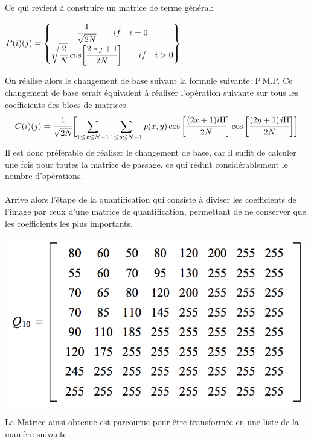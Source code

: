 \documentclass[12pt]{article}
\begin{document}
\paragraph{}

Ce qui revient à construire un matrice de terme général:
\begin{center}
$P(i)(j)=
\begin{Bmatrix}
\cfrac{1}{\sqrt{2N}}  \qquad if \quad i=0 \\
\sqrt{\cfrac{2}{N}} \: cos\biggl[\cfrac{2*j+1}{2N}\biggr] \qquad if \quad i>0 \\
\end{Bmatrix}
$
\end{center}
On réalise alors le changement de base suivant la formule suivante: P.M.P. Ce changement de base serait équivalent à réaliser l'opération suivante sur tous les coefficients des blocs de matrices.
\begin{equation*} 
C(i)(j)=\cfrac{1}{\sqrt{2N}} \biggl[\sum_{1\leq x\leq N-1} \sum_{1\leq y\leq N-1} p(x,y) \cos{\biggl[\cfrac{(2x+1) i \Pi}{2N}}\biggr] \cos{\biggl[\cfrac{(2y+1) j \Pi}{2N}}\biggr]\biggr]
\end{equation*}
Il est donc préférable de réaliser le changement de base, car il suffit de calculer une fois pour toutes la matrice de passage, ce qui réduit considérablement le nombre d'opérations.
\newline
\paragraph{}
 Arrive alors l’étape de la quantification qui consiste à diviser les coefficients de l’image par ceux d’une matrice de quantification, permettant de ne conserver que les coefficients les plus importants. 
 \paragraph{}
 \begin{center}
 \includegraphics[scale=0.75]{photo1}
 \end{center}
\newpage
La Matrice ainsi obtenue est parcourue pour être transformée en une liste de la manière suivante :
\end{document}

